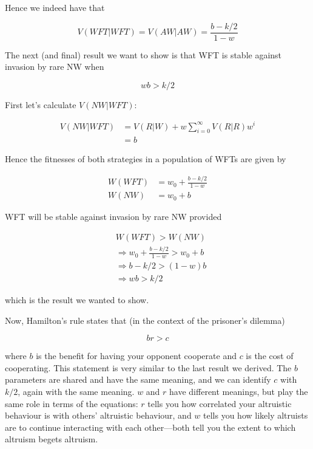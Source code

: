 \documentclass{article}
\begin{document}
Hence we indeed have that

\begin{equation*}
    V(WFT|WFT) = V(AW|AW) = \frac{b - k / 2}{1 - w}
\end{equation*}

The next (and final) result we want to show is that WFT is stable
against invasion by rare NW when

\begin{equation*}
    w b > k / 2
\end{equation*}

First let's calculate $V(NW|WFT)$:

\begin{align*}
    V(NW|WFT) &= V(R|W) + w \sum_{i = 0}^{\infty} V(R|R) w^i \\
              &= b
\end{align*}

Hence the fitnesses of both strategies in a population of WFTs are given by

\begin{align*}
    W(WFT) &= w_0 + \frac{b - k / 2}{1 - w} \\
    W(NW) &= w_0 + b
\end{align*}

WFT will be stable against invasion by rare NW provided

\begin{align*}
    &W(WFT) > W(NW) \\
    &\Rightarrow w_0 + \frac{b - k / 2}{1 - w} > w_0 + b \\
    &\Rightarrow b - k / 2 > (1 - w) b \\
    &\Rightarrow w b > k / 2
\end{align*}

which is the result we wanted to show.

Now, Hamilton's rule states that (in the context of the prisoner's dilemma)

\begin{equation*}
    b r > c
\end{equation*}

where $b$ is the benefit for having your opponent cooperate and $c$ is
the cost of cooperating. This statement is very similar to the last
result we derived. The $b$ parameters are shared and have the same
meaning, and we can identify $c$ with $k / 2$, again with the same
meaning. $w$ and $r$ have different meanings, but play the same role in
terms of the equations: $r$ tells you how correlated your altruistic
behaviour is with others' altruistic behaviour, and $w$ tells you how
likely altruists are to continue interacting with each other---both tell
you the extent to which altruism begets altruism.
\end{document}
